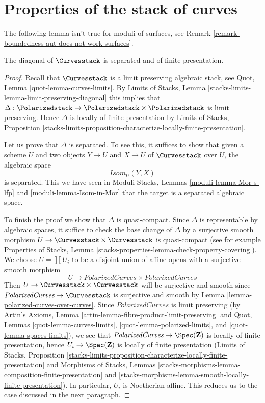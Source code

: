 \section{Properties of the stack of curves}
\label{section-properties}

\noindent
The following lemma isn't true for moduli of surfaces, see
Remark \ref{remark-boundedness-aut-does-not-work-surfaces}.

\begin{lemma}
\label{lemma-curves-diagonal-separated-fp}
The diagonal of $\Curvesstack$ is separated
and of finite presentation.
\end{lemma}

\begin{proof}
Recall that $\Curvesstack$ is a limit preserving algebraic stack, see
Quot, Lemma \ref{quot-lemma-curves-limits}.
By Limits of Stacks, Lemma \ref{stacks-limits-lemma-limit-preserving-diagonal}
this implies that
$\Delta : \Polarizedstack \to \Polarizedstack \times \Polarizedstack$
is limit preserving. Hence $\Delta$ is locally of finite presentation
by Limits of Stacks, Proposition
\ref{stacks-limits-proposition-characterize-locally-finite-presentation}.

\medskip\noindent
Let us prove that $\Delta$ is separated. To see this, it suffices to show
that given a scheme $U$ and two objects $Y \to U$ and $X \to U$ of
$\Curvesstack$ over $U$, the algebraic space
$$
\mathit{Isom}_U(Y, X)
$$
is separated. This we have seen in
Moduli Stacks, Lemmas \ref{moduli-lemma-Mor-s-lfp} and
\ref{moduli-lemma-Isom-in-Mor} that the target is
a separated algebraic space.

\medskip\noindent
To finish the proof we show that $\Delta$ is quasi-compact. Since
$\Delta$ is representable by algebraic spaces, it suffice to check
the base change of $\Delta$ by a surjective smooth morphism
$U \to \Curvesstack \times \Curvesstack$ is quasi-compact
(see for example Properties of Stacks, Lemma
\ref{stacks-properties-lemma-check-property-covering}).
We choose $U = \coprod U_i$ to be a disjoint union of affine opens
with a surjective smooth morphism
$$
U \longrightarrow
\textit{PolarizedCurves} \times \textit{PolarizedCurves}
$$
Then $U \to \Curvesstack \times \Curvesstack$ will be surjective
and smooth since $\textit{PolarizedCurves} \to \Curvesstack$
is surjective and smooth by Lemma \ref{lemma-polarized-curves-over-curves}.
Since $\textit{PolarizedCurves}$ is limit preserving
(by Artin's Axioms, Lemma \ref{artin-lemma-fibre-product-limit-preserving}
and Quot, Lemmas \ref{quot-lemma-curves-limits},
\ref{quot-lemma-polarized-limits}, and
\ref{quot-lemma-spaces-limits}), we
see that $\textit{PolarizedCurves} \to \Spec(\mathbf{Z})$ is locally of
finite presentation, hence $U_i \to \Spec(\mathbf{Z})$ is
locally of finite presentation
(Limits of Stacks, Proposition
\ref{stacks-limits-proposition-characterize-locally-finite-presentation}
and Morphisms of Stacks, Lemmas
\ref{stacks-morphisms-lemma-composition-finite-presentation} and
\ref{stacks-morphisms-lemma-smooth-locally-finite-presentation}).
In particular, $U_i$ is Noetherian affine. This reduces us to the
case discussed in the next paragraph.


\end{proof}
